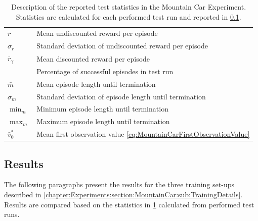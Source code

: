 \documentclass[
    a4paper,
    11pt,
    bibliography=totoc,
    listof=totoc,      
    headinclude=true,
    cleardoublepage=empty,
]{scrbook}
\theoremstyle{plain}
\theoremstyle{definition}
\theoremstyle{remark}
\begin{document}
\begin{table}[htpb!]
    \caption[
        Description of reported test statistics in the Mountain Car Experiment
    ]{
        Description of the reported test statistics in the Mountain Car
        Experiment. Statistics are calculated for each performed test run and
        reported in
        \cref{chapter:Experiments:section:MountainCar:sub:Results}.
    }
    \label{tab:MountainCarTestStatistics}    
    
    \centering    
    \begin{tabularx}{\textwidth}{>{\centering}m{4cm}X}
        \toprule
         ${\overline r}$ & Mean undiscounted reward per episode \\
         ${\sigma_r}$ & 
            Standard deviation of undiscounted reward per episode \\
         ${\overline{r}_\gamma}$ & Mean discounted reward per episode \\
         {succ.} & Percentage of successful episodes in test run \\
         ${\bar m}$ & Mean episode length until termination \\
         ${\sigma_m}$ & 
            Standard deviation of episode length until termination \\
         ${\min_m}$ & Minimum episode length until termination \\
         ${\max_m}$ & Maximum episode length until termination \\
         ${\bar v^*_0}$ & Mean first observation value
            \eqref{eq:MountainCarFirstObservationValue} \\
        \bottomrule
    \end{tabularx}
\end{table}


\subsection{Results} 
\label{chapter:Experiments:section:MountainCar:sub:Results}

The following paragraphs present the results for the three training set-ups
described in \cref{chapter:Experiments:section:MountainCar:sub:TrainingDetails}.
Results are compared based on the statistics in
\cref{tab:MountainCarTestStatistics} calculated from performed test runs.
\end{document}
